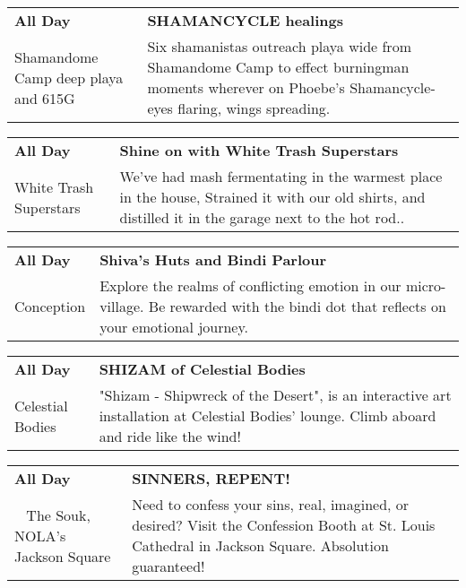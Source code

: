 \begin{tabular}{ p{1in} p{2.2in} }
    \textbf{All Day} & \textbf{SHAMANCYCLE healings} \\
    Shamandome Camp \newline deep playa and 615G & Six shamanistas outreach playa wide from Shamandome Camp to effect burningman moments wherever on Phoebe's Shamancycle- eyes flaring, wings spreading. \\
    \hline 
\end{tabular}
    
\begin{tabular}{ p{1in} p{2.2in} }
    \textbf{All Day} & \textbf{Shine on with White Trash Superstars} \\
    White Trash Superstars \newline  & We've had mash fermentating in the warmest place in the house, Strained it with our old shirts, and distilled it in the garage next to the hot rod.. \\
    \hline 
\end{tabular}
    
\begin{tabular}{ p{1in} p{2.2in} }
    \textbf{All Day} & \textbf{Shiva's Huts and Bindi Parlour} \\
    Conception \newline  & Explore the realms of conflicting emotion in our micro-village.  Be rewarded with the bindi dot that reflects on your emotional journey. \\
    \hline 
\end{tabular}
    
\begin{tabular}{ p{1in} p{2.2in} }
    \textbf{All Day} & \textbf{SHIZAM of Celestial Bodies} \\
    Celestial Bodies \newline  & "Shizam - Shipwreck of the Desert", is an interactive art installation at Celestial Bodies' lounge. Climb aboard and ride like the wind! \\
    \hline 
\end{tabular}
    
\begin{tabular}{ p{1in} p{2.2in} }
    \textbf{All Day} & \textbf{SINNERS, REPENT!} \\
    ~ \newline The Souk, NOLA's Jackson Square  & Need to confess your sins, real, imagined, or desired? Visit the Confession Booth at St. Louis Cathedral in Jackson Square. Absolution guaranteed! \\
    \hline 
\end{tabular}
    
